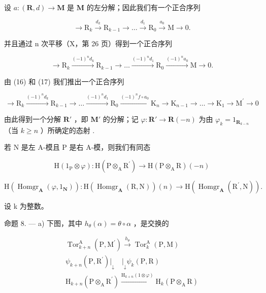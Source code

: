 设 \(a:(\mathbf{R},d)\to \mathbf{M}\) 是 \(\mathbf{M}\) 的左分解；因此我们有一个正合序列

\[
\rightarrow \mathrm{R} _ {k} \xrightarrow {d _ {k}} \mathrm{R} _ {k - 1} \rightarrow \dots \xrightarrow {d _ {1}} \mathrm{R} _ {0} \xrightarrow {a _ {0}} \mathrm{M} \rightarrow 0.
\]

并且通过 n 次平移（X，第 26 页）得到一个正合序列

\[
\rightarrow \mathrm{R} _ {k} \xrightarrow {(- 1) ^ {n} d _ {k}} \mathrm{R} _ {k - 1} \rightarrow \dots \xrightarrow {(- 1) ^ {n} d _ {1}} \mathrm{R} _ {0} \xrightarrow {(- 1) ^ {n} a _ {0}} \mathrm{M} \rightarrow 0.\tag{17}
\]

由 (16) 和 (17) 我们推出一个正合序列

\[
\rightarrow \mathrm{R} _ {k} \xrightarrow {(- 1) ^ {n} d _ {k}} \mathrm{R} _ {k - 1} \rightarrow \dots \xrightarrow {(- 1) ^ {n} d _ {1}} \mathrm{R} _ {0} \xrightarrow {(- 1) ^ {n} f \circ a _ {0}} \mathrm{K} _ {n} \rightarrow \mathrm{K} _ {n - 1} \rightarrow \dots \rightarrow \mathrm{K} _ {1} \rightarrow \mathrm{M} ^ {\prime} \rightarrow 0
\]

由此得到一个分解 \(\mathbf{R}'\) ，即 \(\mathbf{M}'\) 的分解；记 \(\varphi: \mathbf{R}' \to \mathbf{R}(-n)\) 为由 \(\varphi_k = 1_{\mathbf{R}_{k-n}}\) （当 \(k \geqslant n\) ）所确定的态射 .

若 N 是左 A-模且 P 是右 A-模，则我们有同态

\[
\mathrm{H} \left(1 _ {\mathrm{P}} \otimes \varphi\right): \mathrm{H} \left(\mathrm{P} \otimes_ {\mathrm{A}} \mathrm{R} ^ {\prime}\right)\rightarrow \mathrm{H} \left(\mathrm{P} \otimes_ {\mathrm{A}} \mathrm{R}\right) (- n)
\]

\[
\mathrm{H} \left(\operatorname{Homgr} _ {\mathbf {A}} (\varphi , 1 _ {\mathbf {N}})\right): \mathrm{H} \left(\operatorname{Homgr} _ {\mathbf {A}} (\mathrm{R}, \mathrm{N})\right) (n) \rightarrow \mathrm{H} \left(\operatorname{Homgr} _ {\mathbf {A}} \left(\mathrm{R} ^ {\prime}, \mathrm{N}\right)\right).
\]

设 k 为整数。

命题 8. --- a) 下图，其中 \(h_{\theta}(\alpha) = \theta \circ \alpha\) ，是交换的

\[
\begin{array}{c} \operatorname{Tor} _ {k + n} ^ {\mathrm{A}} (\mathrm{P}, \mathrm{M} ^ {\prime}) \xrightarrow {h _ {\theta}} \operatorname{Tor} _ {k} ^ {\mathrm{A}} (\mathrm{P}, \mathrm{M}) \\ \psi_ {k + n} (\mathrm{P}, \mathrm{R} ^ {\prime}) \Big | _ {\downarrow} \quad \Big | _ {\downarrow} \psi_ {k} (\mathrm{P}, \mathrm{R}) \\ \mathrm{H} _ {k + n} (\mathrm{P} \otimes_ {\mathrm{A}} \mathrm{R} ^ {\prime}) \xrightarrow {\mathrm{H} _ {k + n} (1 \otimes \varphi)} \mathrm{H} _ {k} (\mathrm{P} \otimes_ {\mathrm{A}} \mathrm{R}) \end{array}
\]

